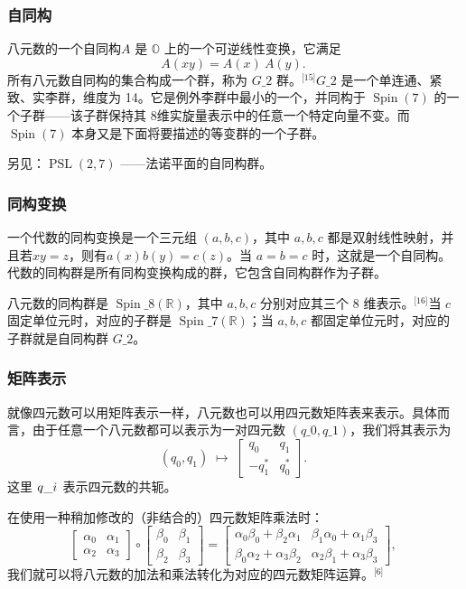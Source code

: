 \subsubsection{自同构}
八元数的一个自同构$A$ 是 $\mathbb{O}$ 上的一个可逆线性变换，它满足
$$
A(xy) = A(x) \ A(y).~
$$
所有八元数自同构的集合构成一个群，称为 $G\_{2}$ 群。\(^\text{[15]}\)$G\_{2}$ 是一个单连通、紧致、实李群，维度为 14。它是例外李群中最小的一个，并同构于 $\operatorname{Spin}(7)$ 的一个子群——该子群保持其 8维实旋量表示中的任意一个特定向量不变。而 $\operatorname{Spin}(7)$ 本身又是下面将要描述的等变群的一个子群。

另见：$\operatorname{PSL}(2,7)$ ——法诺平面的自同构群。
\subsubsection{同构变换}
一个代数的同构变换是一个三元组 $(a,b,c)$，其中 $a,b,c$ 都是双射线性映射，并且若$
xy = z$，则有$a(x)b(y) = c(z)$。当 $a=b=c$ 时，这就是一个自同构。代数的同构群是所有同构变换构成的群，它包含自同构群作为子群。

八元数的同构群是 $\operatorname{Spin}\_{8}(\mathbb{R})$，其中 $a,b,c$ 分别对应其三个 8 维表示。\(^\text{[16]}\)当 $c$ 固定单位元时，对应的子群是 $\operatorname{Spin}\_{7}(\mathbb{R})$；当 $a,b,c$ 都固定单位元时，对应的子群就是自同构群 $G\_{2}$。
\subsubsection{矩阵表示}
就像四元数可以用矩阵表示一样，八元数也可以用四元数矩阵表来表示。具体而言，由于任意一个八元数都可以表示为一对四元数 $(q\_{0}, q\_{1})$，我们将其表示为
$$
(q_{0},q_{1}) \;\longmapsto\; 
\begin{bmatrix}
q_{0} & q_{1} \\
- q_{1}^{*} & q_{0}^{*}
\end{bmatrix}.~
$$
这里 $q\_{i}^{\*}$ 表示四元数的共轭。

在使用一种稍加修改的（非结合的）四元数矩阵乘法时：
$$
\begin{bmatrix}
\alpha_{0} & \alpha_{1} \\
\alpha_{2} & \alpha_{3}
\end{bmatrix}
\circ
\begin{bmatrix}
\beta_{0} & \beta_{1} \\
\beta_{2} & \beta_{3}
\end{bmatrix}
=
\begin{bmatrix}
\alpha_{0}\beta_{0}+\beta_{2}\alpha_{1} & \beta_{1}\alpha_{0}+\alpha_{1}\beta_{3} \\
\beta_{0}\alpha_{2}+\alpha_{3}\beta_{2} & \alpha_{2}\beta_{1}+\alpha_{3}\beta_{3}
\end{bmatrix},~
$$
我们就可以将八元数的加法和乘法转化为对应的四元数矩阵运算。\(^\text{[6]}\)
